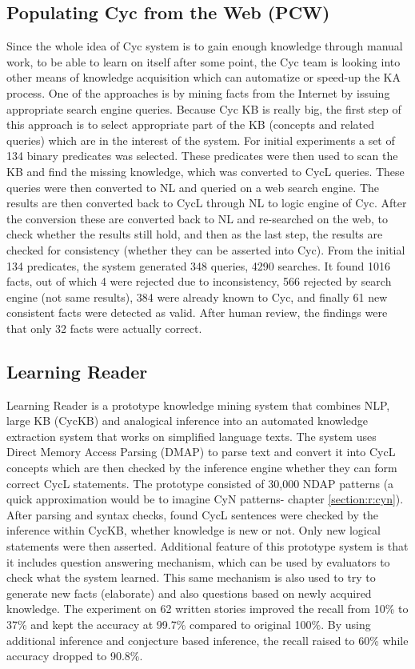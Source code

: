 \subsection{Populating Cyc from the Web (PCW)}
\label{section:r:pcw}
Since the whole idea of Cyc system is to gain enough knowledge through manual
work, to be able to learn on itself after some point, the Cyc team is looking
into other means of knowledge acquisition which can automatize or speed-up the
KA process. One of the approaches is by mining facts from the Internet by
issuing appropriate search engine queries\parencite{Matuszek2004}. Because Cyc
KB is really big, the first step of this approach is to select appropriate part
of the KB (concepts and related queries) which are in the interest of the 
system. For initial experiments  a set of 134 binary predicates was selected.
These predicates were then used to scan the KB and find the missing knowledge,
which was converted to CycL queries. 
These queries were then converted to NL and queried on a web search engine. 
The results are then converted back to CycL through NL to logic engine of Cyc. 
After the conversion these are converted back to NL and re-searched on the web,
to check whether the results still hold, and then as the last step, the 
results are checked for consistency (whether they can be asserted into Cyc). 
From the initial 134 predicates, the system generated 348 queries, 
4290 searches. It found 1016 facts, out of which 4 were rejected
due to inconsistency, 566 rejected by search engine (not same results), 384 
were already known to Cyc, and finally 61 new consistent facts were detected 
as valid. After human review, the findings were that only 32 facts were 
actually correct.

\subsection{Learning Reader}
\label{section:r:lr}
Learning Reader\parencite{Forbus2007} is a prototype knowledge mining system
that combines NLP, large KB (CycKB) and analogical inference into an automated 
knowledge extraction system that works on simplified language texts. The system
uses Direct Memory Access Parsing (DMAP\parencite{Martin1986}) to parse text
and convert it into CycL concepts which are then checked by the inference engine
whether they can form correct CycL statements. The prototype consisted of
30,000 NDAP patterns (a quick approximation would be to imagine CyN patterns-
chapter \ref{section:r:cyn}). After parsing and syntax checks, found CycL 
sentences were checked by the inference within CycKB, whether knowledge is new
or not. Only new logical statements were then asserted. Additional feature of
this prototype system is that it includes question answering mechanism, which 
can be used by evaluators to check what the system learned. This same mechanism
is also used to try to generate new facts (elaborate) and also questions based
on newly acquired knowledge. The experiment on 62 written stories improved the
recall from 10\% to 37\% and kept the accuracy at 99.7\% compared to original 
100\%. By using additional inference and conjecture based inference, the recall
raised to 60\% while accuracy dropped to 90.8\%.

